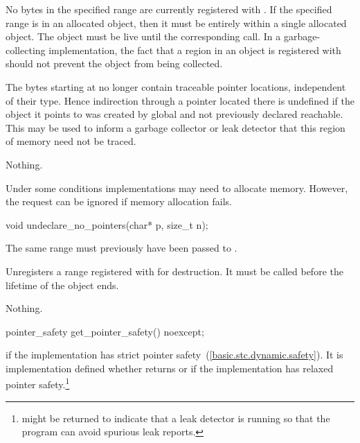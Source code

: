 \begin{itemdescr}
\pnum
\requires No bytes in the specified range
are currently registered with
. If the specified range is in an allocated object,
then it must be entirely within a single allocated object. The object must be
live until the corresponding  call. \enternote In
a garbage-collecting implementation, the fact that a region in an object is
registered with  should not prevent the object from
being collected. \exitnote

\pnum
\effects The  bytes starting at  no longer contain
traceable pointer locations, independent of their type. Hence
indirection through a pointer located there is undefined if the object
it points to was created by global  and not
previously declared reachable. \enternote This may be used to inform a
garbage collector or leak detector that this region of memory need not
be traced. \exitnote

\pnum
\throws Nothing.

\pnum
\enternote Under some conditions implementations may need to allocate memory.
However, the request can be ignored if memory allocation fails. \exitnote
\end{itemdescr}

%
\begin{itemdecl}
void undeclare_no_pointers(char* p, size_t n);
\end{itemdecl}

\begin{itemdescr}
\pnum
\requires The same range must previously have been passed to
.

\pnum
\effects Unregisters a range registered with  for
destruction. It must be called before the lifetime of the object ends.

\pnum
\throws Nothing.
\end{itemdescr}

%
\begin{itemdecl}
pointer_safety get_pointer_safety() noexcept;
\end{itemdecl}

\begin{itemdescr}
\pnum
\returns {} if the implementation has strict pointer
safety~(\ref{basic.stc.dynamic.safety}). It is implementation defined%
whether
 returns  or
 if the implementation has relaxed pointer
safety.\footnote{ might be returned to indicate
that a leak detector is running so that the program can avoid spurious leak
reports.}
\end{itemdescr}


